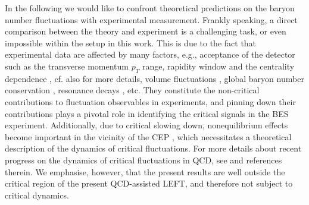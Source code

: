 \documentclass[%
reprint,
superscriptaddress,
showpacs,preprintnumbers,
amsmath,amssymb,
aps,
prd,
]{revtex4-1}
\begin{document}
	In the following we would like to confront theoretical predictions on the baryon number fluctuations with experimental measurement. Frankly speaking, a direct comparison between the theory and experiment is a challenging task, or even impossible within the setup in this work. This is due to the fact that experimental data are affected by many factors, e.g.,  acceptance of the detector such as the transverse momentum $p_T$ range, rapidity window and the centrality dependence \cite{Adamczyk:2013dal,Luo:2015ewa,Adam:2020unf,Nonaka:2020crv,Pandav:2020uzx}, cf. also \cite{Luo:2017faz,Adamczyk:2017iwn} for more details, volume fluctuations \cite{Luo:2013bmi}, global baryon number conservation \cite{Braun-Munzinger:2016yjz,Vovchenko:2020tsr}, resonance decays \cite{Nahrgang:2014fza}, etc. They constitute the non-critical contributions to fluctuation observables in experiments, and pinning down their contributions plays a pivotal role in identifying the critical signals in the BES experiment. Additionally, due to critical slowing down, nonequilibrium effects become important in the vicinity of the CEP \cite{Berdnikov:1999ph}, which necessitates a theoretical description of the dynamics of critical fluctuations. For more details about recent progress on the dynamics of critical fluctuations in QCD, see \cite{Bluhm:2020mpc} and references therein. We emphasise, however, that the present results are well outside the critical region of the present QCD-assisted LEFT, and therefore not subject to critical dynamics. 
	
\end{document}
